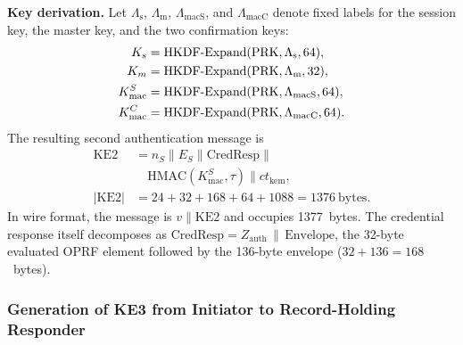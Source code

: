 \documentclass{ieeeijc}
\newcommand{\KLabel}[1]{\Lambda_{\mathrm{#1}}}
\theoremstyle{remark}
\begin{document}
\textbf{Key derivation.} Let
$\KLabel{s}$, $\KLabel{m}$, $\KLabel{macS}$, and $\KLabel{macC}$
denote fixed labels for the session key, the master key, and the two
confirmation keys:
\begin{align}
  K_s &= \mathrm{HKDF\text{-}Expand}(\mathrm{PRK}, \KLabel{s}, 64),
  \notag\\
  K_m &= \mathrm{HKDF\text{-}Expand}(\mathrm{PRK}, \KLabel{m}, 32),
  \notag\\
  K_{\mathrm{mac}}^S &= \mathrm{HKDF\text{-}Expand}(\mathrm{PRK},
    \KLabel{macS}, 64),
  \notag\\
  K_{\mathrm{mac}}^C &= \mathrm{HKDF\text{-}Expand}(\mathrm{PRK},
    \KLabel{macC}, 64).
  \label{eq:key-derivation}
\end{align}
The resulting second authentication message is
\begin{equation}
  \begin{aligned}
    \mathrm{KE2} &= n_S \| E_S \| \mathrm{CredResp} \| {}\\
    &\quad \mathrm{HMAC}(K_{\mathrm{mac}}^S, \tau) \| ct_{\mathrm{kem}},\\
    |\mathrm{KE2}| &= 24 + 32 + 168 + 64 + 1088
      = 1376~\text{bytes}.
  \end{aligned}
\end{equation}
In wire format, the message is $v \| \mathrm{KE2}$ and occupies
1377~bytes. The credential response itself decomposes as
$\mathrm{CredResp} = Z_{\mathrm{auth}} \,\|\, \mathrm{Envelope}$, the
32-byte evaluated OPRF element followed by the 136-byte envelope
($32 + 136 = 168$~bytes).

\subsubsection{Generation of KE3 from Initiator to Record-Holding Responder}
\end{document}
